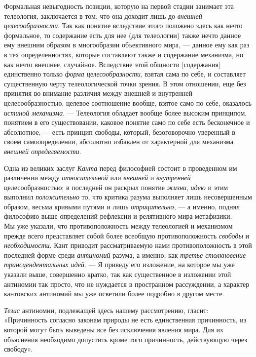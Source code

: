 \documentclass[twoside]{article}
\begin{document}
{{{{Формальная невыгодность позиции, которую на первой стадии
занимает эта телеология, заключается в том, что она доходит лишь до
{\em внешней целесообразности}.
Так как понятие вследствие этого положено здесь как нечто
формальное, то содержание есть для нее (для телеологии) также нечто данное
ему внешним образом в многообразии объективного мира, —
данное ему как раз в тех определенностях, которые составляют
также и содержание механизма, но как нечто внешнее, случайное. Вследствие
этой общности [содержания] единственно только
{\em форма целесообразности},
взятая сама по себе, и составляет существенную черту
телеологической точки зрения. В этом отношении, еще без принятия во
внимание различия между внешней и внутренней целесообразностью, целевое
соотношение вообще, взятое само по себе, оказалось
{\em истиной механизма}. —
Телеология обладает вообще более высоким принципом, понятием
в его существовании, каковое понятие само по себе есть бесконечное и
абсолютное, — есть принцип свободы, который, безоговорочно
уверенный в своем самоопределении, абсолютно избавлен от характерной для
механизма {\em внешней определяемости}.

Одна из великих заслуг
{\em Канта} перед
философией состоит в проведенном им различении между
{\em относительной} или
{\em внешней} и
{\em внутренней}
целесообразностью; в последней он раскрыл понятие
{\em жизни},
{\em идею} и этим выполнил
{\em положительно} то,
что критика разума выполняет лишь несовершенным образом, весьма кривыми
путями и лишь {\em отрицательно}, —
а именно, поднял философию выше определений рефлексии и
релятивного мира метафизики. — Мы уже указали, что
противоположность между телеологией и механизмом прежде всего представляет
собой более всеобщую противоположность
{\em свободы} и
{\em необходимости}. Кант
приводит рассматриваемую нами противоположность в этой последней форме
среди {\em антиномий}
разума, а именно, как
{\em третье столкновение
трансцендентальных идей}. — Я приведу его изложение, на
которое мы уже указали выше, совершенно кратко, так как существенное в
изложении этой антиномии так просто, что не нуждается в пространном
рассуждении, а характер кантовских антиномий мы уже осветили
более подробно в другом месте.

{\em Тезис} антиномии,
подлежащей здесь нашему рассмотрению, гласит: «Причинность согласно законам
природы не есть единственная причинность, из которой могут быть выведены
все без исключения явления мира. Для их объяснения необходимо допустить
кроме того причинность, действующую через свободу».

}}}}
\end{document}
